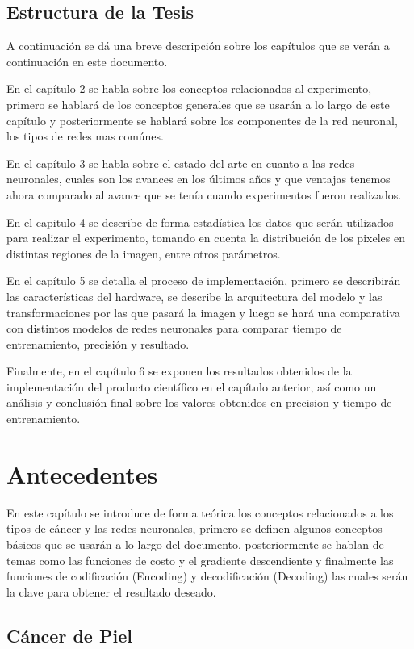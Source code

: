 \section{Estructura de la Tesis}

A continuación se dá una breve descripción sobre los capítulos que se verán a continuación en este documento.

En el capítulo 2 se habla sobre los conceptos relacionados al experimento, primero se hablará de los conceptos generales que se usarán a lo largo de este capítulo y posteriormente se hablará sobre los componentes de la red neuronal, los tipos de redes mas comúnes. 

En el capítulo 3 se habla sobre el estado del arte en cuanto a las redes neuronales, cuales son los avances en los últimos años y que ventajas tenemos ahora comparado al avance que se tenía cuando experimentos fueron realizados.

En el capitulo 4 se describe de forma estadística los datos que serán utilizados para realizar el experimento, tomando en cuenta la distribución de los pixeles en distintas regiones de la imagen, entre otros parámetros. 

En el capítulo 5 se detalla el proceso de implementación, primero se describirán las características del hardware, se describe la arquitectura del modelo y las transformaciones por las que pasará la imagen y luego se hará una comparativa con distintos modelos de redes neuronales para comparar tiempo de entrenamiento, precisión y resultado.

Finalmente, en el capítulo 6 se exponen los resultados obtenidos de la implementación del producto científico en el capítulo anterior, así como un análisis y conclusión final sobre los valores obtenidos en precision y tiempo de entrenamiento. 

\chapter{Antecedentes}
En este capítulo se introduce de forma teórica los conceptos relacionados a los tipos de cáncer y las redes neuronales, primero se definen algunos conceptos básicos que se usarán a lo largo del documento, posteriormente se hablan de temas como las funciones de costo y el gradiente descendiente y finalmente las funciones de codificación (Encoding) y decodificación (Decoding) las cuales serán la clave para obtener el resultado deseado.

\section{Cáncer de Piel}

